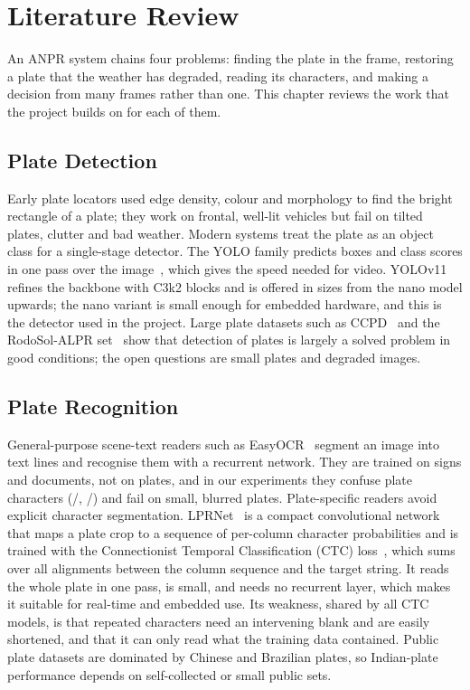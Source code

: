 \chapter{Literature Review}
\label{ch:lit}

An ANPR system chains four problems: finding the plate in the frame, restoring
a plate that the weather has degraded, reading its characters, and making a
decision from many frames rather than one. This chapter reviews the work that
the project builds on for each of them.

\section{Plate Detection}

Early plate locators used edge density, colour and morphology to find the
bright rectangle of a plate; they work on frontal, well-lit vehicles but fail
on tilted plates, clutter and bad weather. Modern systems treat the plate as an
object class for a single-stage detector. The YOLO family predicts boxes and
class scores in one pass over the image~\cite{redmon2016yolo}, which gives the
speed needed for video. YOLOv11~\cite{jocher2024yolo11} refines the backbone
with C3k2 blocks and is offered in sizes from the nano model upwards; the nano
variant is small enough for embedded hardware, and this is the detector used in
the project. Large plate datasets such as CCPD~\cite{xu2018ccpd} and the
RodoSol-ALPR set~\cite{laroca2022rodosol} show that detection of plates is
largely a solved problem in good conditions; the open questions are small
plates and degraded images.

\section{Plate Recognition}

General-purpose scene-text readers such as EasyOCR~\cite{jaided2020easyocr}
segment an image into text lines and recognise them with a recurrent network.
They are trained on signs and documents, not on plates, and in our experiments
they confuse plate characters (/, /) and
fail on small, blurred plates. Plate-specific readers avoid explicit character
segmentation. LPRNet~\cite{zherzdev2018lprnet} is a compact convolutional
network that maps a plate crop to a sequence of per-column character
probabilities and is trained with the Connectionist Temporal Classification
(CTC) loss~\cite{graves2006ctc}, which sums over all alignments between the
column sequence and the target string. It reads the whole plate in one pass, is
small, and needs no recurrent layer, which makes it
suitable for real-time and embedded use. Its weakness, shared by all CTC
models, is that repeated characters need an intervening blank and are easily
shortened, and that it can only read what the training data contained.
Public plate datasets are dominated by Chinese and Brazilian plates, so
Indian-plate performance depends on self-collected or small public sets.

